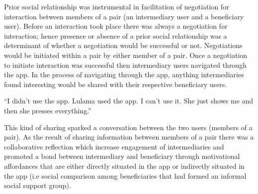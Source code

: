 Prior social relationship was instrumental in facilitation of negotiation for interaction between members of a pair (an intermediary user and a beneficiary user). Before an interaction took place there was always a negotiation for interaction; hence presence or absence of a prior social relationship was a determinant of whether a negotiation would be successful or not. Negotiations would be initiated within a pair by either member of a pair. Once a negotiation to initiate interaction was successful then intermediary users navigated through the app. In the process of navigating through the app, anything intermediaries found interesting would be shared with their respective beneficiary users.

 {``I didn't use the app. Lulama used the app. I can't use it. She just shows me and then she presses everything.''}

This kind of sharing sparked a conversation between the two users (members of a pair). As the result of sharing information between members of a pair there was a collaborative reflection which increase engagement of intermediaries and promoted a bond between intermediary and beneficiary through motivational affordances that are either directly situated in the app or indirectly situated in the app (i.e social comparison among beneficiaries that had formed an informal social support group). 